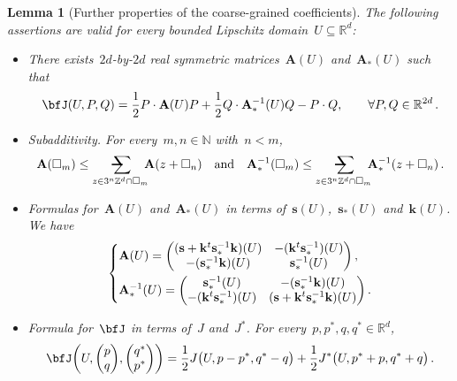 \documentclass[11pt,twoside]{article} %
\makeatletter
\let\oldsquare\square %
\renewcommand{\square}{\oldsquare}
\numberwithin{equation}{section}
\newtheorem{lemma}[theorem]{Lemma}
\theoremstyle{definition}
\let\originalleft\left
\let\originalright\right
\renewcommand{\left}{\mathopen{}\mathclose\bgroup\originalleft}
\renewcommand{\right}{\aftergroup\egroup\originalright}
\newcommand*{\N}{\ensuremath{\mathbb{N}}}
\newcommand*{\R}{\ensuremath{\mathbb{R}}}
\newcommand*{\Zd}{\ensuremath{\mathbb{Z}^d}}
\newcommand*{\Rd}{\ensuremath{\mathbb{R}^d}}
\newcommand{\s}{\mathbf{s}}
\renewcommand{\k}{\mathbf{k}}
\newcommand{\cu}{\square}
\newcommand{\avsum}{\mathop{\mathpalette\avsuminner\relax}\displaylimits}
\newcommand\avsuminner[2]{%
  {\sbox0{$\m@th#1\sum$}%
   \vphantom{\usebox0}%
   \ooalign{%
     \hidewidth
     \smash{\,\rule[.23em]{8.8pt}{1.1pt} \relax}%
     \hidewidth\cr
   ~$\m@th#1\sum$\cr
   }%
  }%
}
\newcommand{\bfA}{\mathbf{A}}
\makeatother
\begin{document}
\begin{lemma}[Further properties of the coarse-grained coefficients]
\label{l.J.basicprops.nosymm.moar}
The following assertions are valid for every bounded Lipschitz domain~$U \subseteq\Rd$:

\begin{itemize} 

\item There exists~$2d$-by-$2d$ real symmetric matrices~$\bfA(U)$ and~$\bfA_*(U)$ such that  
\begin{align}
\label{e.Jsplitting.nonsymm}
\bfJ(U,P,Q )
=
\frac12 P \cdot \bfA(U) P 
+ 
\frac12 Q \cdot \bfA_*^{-1}(U) Q
- P \cdot Q, \qquad \forall P,Q  \in \R^{2d}
\,.
\end{align}

\item \emph{Subadditivity.}
For every~$m,n\in\N$ with~$n<m$, 
\begin{equation}
\label{e.subadda.nosymm}
\bfA(\cu_m) 
\leq 
\avsum_{z\in 3^n\Zd \cap \cu_m} \!\!\!
\bfA(z+\cu_n) 
\quad \mbox{and} \quad 
\bfA_*^{-1} (\cu_m) 
\leq 
\avsum_{z\in 3^n\Zd \cap \cu_m} \!\!\!
\bfA_*^{-1}(z+\cu_n) 
\,.
\end{equation}


\item \emph{Formulas for~$\bfA(U)$ and~$\bfA_*(U)$ in terms of~$\s(U)$,~$\s_*(U)$ and~$\k(U)$.} We have
\begin{equation}
\label{e.matrices.formulas}
\left\{
\begin{aligned}
& 
\bfA(U)
= \begin{pmatrix} (\s + \k^t\s_*^{-1}\k)(U) & -(\k^t\s_*^{-1})(U) \\ -(\s_*^{-1}\k)(U) & \s_*^{-1}(U) \end{pmatrix}\,,
\\ & 
\bfA_*^{-1}(U)
= \begin{pmatrix} \s_*^{-1}(U) & -(\s_*^{-1}\k)(U) \\ -(\k^t\s_*^{-1})(U) & (\s + \k^t\s_*^{-1}\k)(U) 
\end{pmatrix}\,.
\end{aligned}
\right.
\end{equation}

\item \emph{Formula for~$\bfJ$ in terms of~$J$ and~$J^*$.} For every~$p,p^*,q,q^*\in\Rd$, 
\begin{equation}
\label{e.bfJ.byJJstar}
\bfJ
\biggl(U, \begin{pmatrix} p  \\ q \end{pmatrix}, \begin{pmatrix} q^* \\ p^* \end{pmatrix} \biggr)
=
\frac12 J\bigl(U,p-p^*,q^*-q\bigr)
+ 
\frac12 J^*\bigl(U,p^*+p,q^*+q\bigr)
\,.
\end{equation}


\end{itemize}
\end{lemma}
\end{document}
